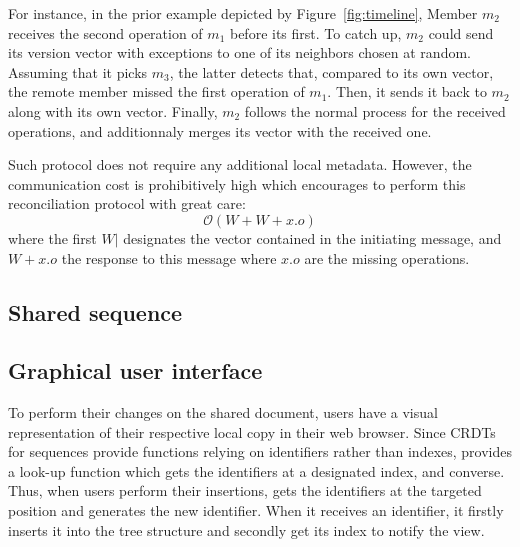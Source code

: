For instance, in the prior example depicted by Figure~\ref{fig:timeline}, Member
$m_2$ receives the second operation of $m_1$ before its first. To catch up,
$m_2$ could send its version vector with exceptions to one of its neighbors
chosen at random. Assuming that it picks $m_3$, the latter detects that,
compared to its own vector, the remote member missed the first operation of
$m_1$. Then, it sends it back to $m_2$ along with its own vector. Finally, $m_2$
follows the normal process for the received operations, and additionnaly merges
its vector with the received one.

Such protocol does not require any additional local metadata. However, the
communication cost is prohibitively high which encourages to perform this
reconciliation protocol with great care:
\begin{equation}
  \mathcal{O}(W+W+x.o)
\end{equation}
where the first $W|$ designates the vector contained in the initiating
message, and $W+x.o$ the response to this message where $x.o$ are the missing
operations.

\subsection{Shared sequence}

    
\subsection{Graphical user interface}

To perform their changes on the shared document, users have a visual
representation of their respective local copy in their web browser.  Since CRDTs
for sequences provide functions relying on identifiers rather than indexes,
\CRATE provides a look-up function which gets the identifiers at a designated
index, and converse.  Thus, when users perform their insertions, \CRATE gets the
identifiers at the targeted position and generates the new identifier. When it
receives an identifier, it firstly inserts it into the tree structure and
secondly get its index to notify the view.

%   

